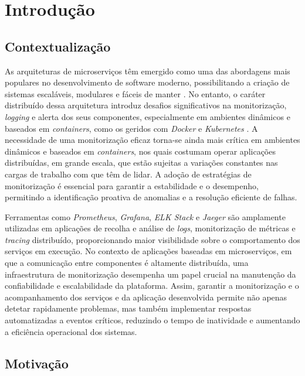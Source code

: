 \chapter{Introdução}

\section{Contextualização}

As arquiteturas de microserviços têm emergido como uma das abordagens mais populares no desenvolvimento de software moderno, possibilitando a criação de sistemas escaláveis, modulares e fáceis de manter \cite{Larrucea2018}. No entanto, o caráter distribuído dessa arquitetura introduz desafios significativos na monitorização, \textit{logging} e alerta dos seus componentes, especialmente em ambientes dinâmicos e baseados em \textit{containers}, como os geridos com \textit{Docker} e \textit{Kubernetes} \cite{Liu2020}. A necessidade de uma monitorização eficaz torna-se ainda mais crítica em ambientes dinâmicos e baseados em \textit{containers}, nos quais costumam operar aplicações distribuídas, em grande escala, que estão sujeitas a variações constantes nas cargas de trabalho com que têm de lidar. A adoção de estratégias de monitorização é essencial para garantir a estabilidade e o desempenho, permitindo a identificação proativa de anomalias e a resolução eficiente de falhas.

Ferramentas como \textit{Prometheus}, \textit{Grafana}, \textit{ELK Stack} e \textit{Jaeger} são amplamente utilizadas em aplicações de recolha e análise de \textit{logs}, monitorização de métricas e \textit{tracing} distribuído, proporcionando maior visibilidade sobre o comportamento dos serviços em execução. No contexto de aplicações baseadas em microserviços, em que a comunicação entre componentes é altamente distribuída, uma infraestrutura de monitorização desempenha um papel crucial na manutenção da confiabilidade e escalabilidade da plataforma. Assim, garantir a monitorização e o acompanhamento dos serviços e da aplicação desenvolvida permite não apenas detetar rapidamente problemas, mas também implementar respostas automatizadas a eventos críticos, reduzindo o tempo de inatividade e aumentando a eficiência operacional dos sistemas.



\section{Motivação}

